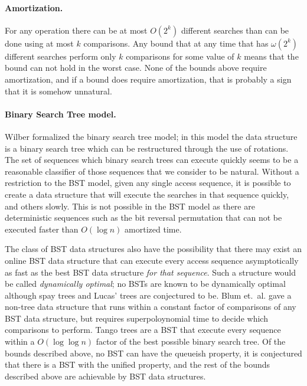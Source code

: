 \documentclass{llncs}
\newcommand{\BigOh}[1]{O\!\left(#1\right)}
\newcommand{\LittleOmega}[1]{\omega\!\left(#1\right)}
\begin{document}
\paragraph{Amortization.} For any operation there can be at most $\BigOh{2^k}$ different searches than can be done using at most $k$ comparisons. Any bound that at any time that has $\LittleOmega{2^k}$ different searches perform only $k$ comparisons for some value of $k$ means that the bound can not hold in the worst case. None of the bounds above require amortization, and if a bound does require amortization, that is probably a sign that it is somehow unnatural.

\paragraph{Binary Search Tree model.} Wilber \cite{DBLP:journals/siamcomp/Wilber89} formalized the binary search tree model; in this model the data structure is a binary search tree which can be restructured through the use of rotations. The set of sequences which binary search trees can execute quickly seems to be a reasonable classifier of those sequences that we consider to be natural. Without a restriction to the BST model, given any single access sequence, it is possible to create a data structure that will execute the searches in that sequence quickly, and others slowly. This is not possible in the BST model as there are deterministic sequences such as the bit reversal permutation that can not be executed faster than $\BigOh{\log n}$ amortized time.

The class of BST data structures also have the possibility that there may exist an online BST data structure that can execute every access sequence asymptotically as fast as the best BST data structure \emph{for that sequence}. Such a structure would be called \emph{dynamically optimal}; no BSTs are known to be dynamically optimal although spay trees and Lucas' trees \cite{lucas} are conjectured to be. Blum et.~al. \cite{blum} gave a non-tree data structure that runs within a constant factor of comparisons of any BST data structure, but requires superpoloynomial time to decide which comparisons to perform. Tango trees \cite{DBLP:journals/siamcomp/DemaineHIP07} are a BST that execute every sequence within a $\BigOh{\log \log n}$ factor of the best possible binary search tree. Of the bounds described above, no BST can have the queueish property, it is conjectured that there is a BST with the unified property, and the rest of the bounds described above are achievable by BST data structures.
\end{document}
